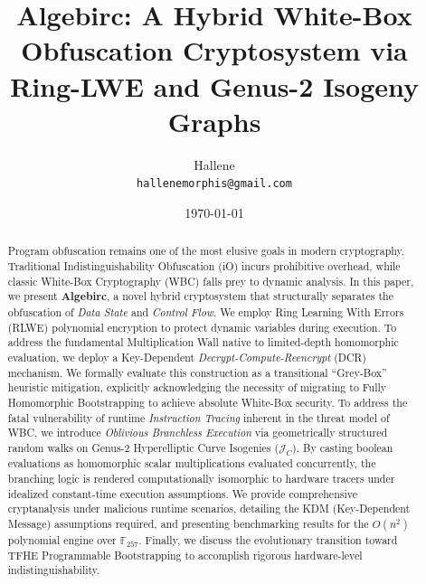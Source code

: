 \documentclass[12pt]{article}
\title{\textbf{Algebirc: A Hybrid White-Box Obfuscation Cryptosystem via Ring-LWE and Genus-2 Isogeny Graphs}}
\author{Hallene \\ \texttt{hallenemorphis@gmail.com}}
\date{\today}
\newcommand{\F}{\mathbb{F}}
\begin{document}
\maketitle

\begin{abstract}
Program obfuscation remains one of the most elusive goals in modern cryptography. Traditional Indistinguishability Obfuscation (iO) incurs prohibitive overhead, while classic White-Box Cryptography (WBC) falls prey to dynamic analysis.
In this paper, we present \textbf{Algebirc}, a novel hybrid cryptosystem that structurally separates the obfuscation of \textit{Data State} and \textit{Control Flow}. 
We employ Ring Learning With Errors (RLWE) polynomial encryption to protect dynamic variables during execution. To address the fundamental Multiplication Wall native to limited-depth homomorphic evaluation, we deploy a Key-Dependent \textit{Decrypt-Compute-Reencrypt} (DCR) mechanism. We formally evaluate this construction as a transitional ``Grey-Box'' heuristic mitigation, explicitly acknowledging the necessity of migrating to Fully Homomorphic Bootstrapping to achieve absolute White-Box security.
To address the fatal vulnerability of runtime \textit{Instruction Tracing} inherent in the threat model of WBC, we introduce \textit{Oblivious Branchless Execution} via geometrically structured random walks on Genus-2 Hyperelliptic Curve Isogenies ($\mathcal{J}_C$). 
By casting boolean evaluations as homomorphic scalar multiplications evaluated concurrently, the branching logic is rendered computationally isomorphic to hardware tracers under idealized constant-time execution assumptions. We provide comprehensive cryptanalysis under malicious runtime scenarios, detailing the KDM (Key-Dependent Message) assumptions required, and presenting benchmarking results for the $O(n^2)$ polynomial engine over $\F_{257}$. 
Finally, we discuss the evolutionary transition toward TFHE Programmable Bootstrapping to accomplish rigorous hardware-level indistinguishability.
\end{abstract}

\tableofcontents
\newpage











\newpage

\end{document}
